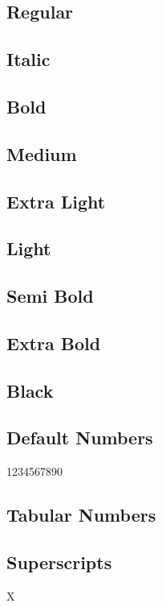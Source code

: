 \documentclass{article}
\begin{document}
\subsection*{Regular}
\lipsum[1]

\subsection*{Italic}
\textit{\lipsum[2]}

\subsection*{Bold}
\textbf{\lipsum[2]}

\subsection*{Medium}
{\selectfont\lipsum[5]}

\subsection*{Extra Light}
{\selectfont\lipsum[5]}

\subsection*{Light}
{\selectfont\lipsum[5]}

\subsection*{Semi Bold}
{\selectfont\lipsum[6]}

\subsection*{Extra Bold}
{\selectfont\lipsum[6]}

\subsection*{Black}
{\selectfont\lipsum[6]}

\subsection*{Default Numbers}
1234567890

\subsection*{Tabular Numbers}
{}


\subsection*{Superscripts}
X{}
\end{document}
